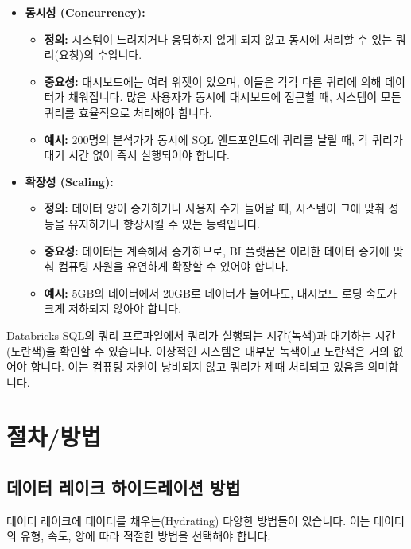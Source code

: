 \documentclass[11pt,a4paper]{article}
\begin{document}
\begin{itemize}
    \item \textbf{동시성 (Concurrency):}
    \begin{itemize}
        \item \textbf{정의:} 시스템이 느려지거나 응답하지 않게 되지 않고 동시에 처리할 수 있는 쿼리(요청)의 수입니다.
        \item \textbf{중요성:} 대시보드에는 여러 위젯이 있으며, 이들은 각각 다른 쿼리에 의해 데이터가 채워집니다. 많은 사용자가 동시에 대시보드에 접근할 때, 시스템이 모든 쿼리를 효율적으로 처리해야 합니다.
        \item \textbf{예시:} 200명의 분석가가 동시에 SQL 엔드포인트에 쿼리를 날릴 때, 각 쿼리가 대기 시간 없이 즉시 실행되어야 합니다.
    \end{itemize}
    \item \textbf{확장성 (Scaling):}
    \begin{itemize}
        \item \textbf{정의:} 데이터 양이 증가하거나 사용자 수가 늘어날 때, 시스템이 그에 맞춰 성능을 유지하거나 향상시킬 수 있는 능력입니다.
        \item \textbf{중요성:} 데이터는 계속해서 증가하므로, BI 플랫폼은 이러한 데이터 증가에 맞춰 컴퓨팅 자원을 유연하게 확장할 수 있어야 합니다.
        \item \textbf{예시:} 5GB의 데이터에서 20GB로 데이터가 늘어나도, 대시보드 로딩 속도가 크게 저하되지 않아야 합니다.
    \end{itemize}
\end{itemize}

\begin{tcolorbox}[mywarning={쿼리 프로파일의 중요성}]
Databricks SQL의 쿼리 프로파일에서 쿼리가 실행되는 시간(녹색)과 대기하는 시간(노란색)을 확인할 수 있습니다. 이상적인 시스템은 대부분 녹색이고 노란색은 거의 없어야 합니다. 이는 컴퓨팅 자원이 낭비되지 않고 쿼리가 제때 처리되고 있음을 의미합니다.
\end{tcolorbox}

\newpage
\section{절차/방법}

\subsection{데이터 레이크 하이드레이션 방법}
데이터 레이크에 데이터를 채우는(Hydrating) 다양한 방법들이 있습니다. 이는 데이터의 유형, 속도, 양에 따라 적절한 방법을 선택해야 합니다.
\end{document}
